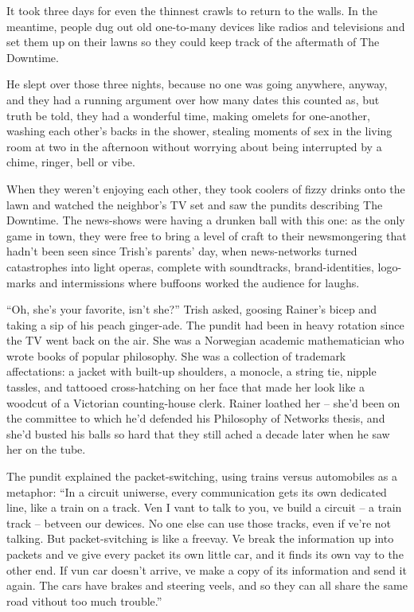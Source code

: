 It took three days for even the thinnest crawls to return to the walls. 
In the meantime, people dug out old one-to-many devices like radios and 
televisions and set them up on their lawns so they could keep track of 
the aftermath of The Downtime.

He slept over those three nights, because no one was going anywhere, 
anyway, and they had a running argument over how many dates this 
counted as, but truth be told, they had a wonderful time, making 
omelets for one-another, washing each other's backs in the shower, 
stealing moments of sex in the living room at two in the afternoon 
without worrying about being interrupted by a chime, ringer, bell or 
vibe.

When they weren't enjoying each other, they took coolers of fizzy 
drinks onto the lawn and watched the neighbor's TV set and saw the 
pundits describing The Downtime. The news-shows were having a drunken 
ball with this one: as the only game in town, they were free to bring a 
level of craft to their newsmongering that hadn't been seen since 
Trish's parents' day, when news-networks turned catastrophes into light 
operas, complete with soundtracks, brand-identities, logo-marks and 
intermissions where buffoons worked the audience for laughs.

“Oh, she's your favorite, isn't she?” Trish asked, goosing Rainer's 
bicep and taking a sip of his peach ginger-ade. The pundit had been in 
heavy rotation since the TV went back on the air. She was a Norwegian 
academic mathematician who wrote books of popular philosophy. She was a 
collection of trademark affectations: a jacket with built-up shoulders, 
a monocle, a string tie, nipple tassles, and tattooed cross-hatching on 
her face that made her look like a woodcut of a Victorian 
counting-house clerk. Rainer loathed her -- she'd been on the committee 
to which he'd defended his Philosophy of Networks thesis, and she'd 
busted his balls so hard that they still ached a decade later when he 
saw her on the tube.

The pundit explained the packet-switching, using trains versus 
automobiles as a metaphor: “In a circuit uniwerse, every 
communication gets its own dedicated line, like a train on a track. Ven 
I vant to talk to you, ve build a circuit -- a train track -- betveen 
our dewices. No one else can use those tracks, even if ve're not 
talking. But packet-svitching is like a freevay. Ve break the 
information up into packets and ve give every packet its own little 
car, and it finds its own vay to the other end. If vun car doesn't 
arrive, ve make a copy of its information and send it again. The cars 
have brakes and steering veels, and so they can all share the same road 
vithout too much trouble.”

